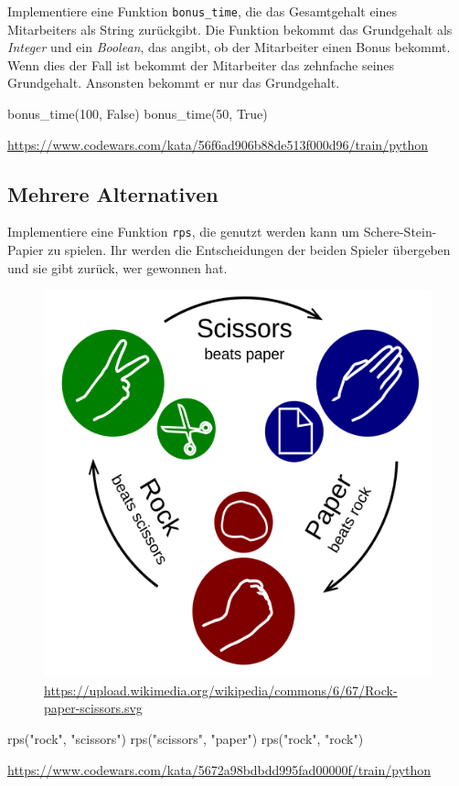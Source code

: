 \documentclass[class=scrartcl, crop=false]{standalone}
\begin{document}
\begin{aufgabe} \noindent
Implementiere eine Funktion \texttt{bonus_time}, die das Gesamtgehalt eines Mitarbeiters als String zurückgibt.
Die Funktion bekommt das Grundgehalt als \emph{Integer} und ein \emph{Boolean}, das angibt, ob der Mitarbeiter einen Bonus bekommt. Wenn dies der Fall ist bekommt der Mitarbeiter das zehnfache seines Grundgehalt. Ansonsten bekommt er nur das Grundgehalt.

\begin{pyconsole}
bonus_time(100, False)
bonus_time(50, True)
\end{pyconsole}
	
\noindent\url{https://www.codewars.com/kata/56f6ad906b88de513f000d96/train/python}


\end{aufgabe}


\subsection{Mehrere Alternativen}

\begin{aufgabe} \noindent
Implementiere eine Funktion \texttt{rps}, die genutzt werden kann um Schere-Stein-Papier zu spielen. Ihr werden die Entscheidungen der beiden Spieler übergeben und sie gibt zurück, wer gewonnen hat.

\begin{figure}[H]
	\centering	
	\includegraphics[width=0.4\linewidth]{rock-paper-scissors}
	\tiny \caption{\tiny \noindent\url{https://upload.wikimedia.org/wikipedia/commons/6/67/Rock-paper-scissors.svg}}
\end{figure}

\begin{pyconsole}
rps("rock", "scissors")
rps("scissors", "paper")
rps("rock", "rock")
\end{pyconsole}
	
\noindent\url{https://www.codewars.com/kata/5672a98bdbdd995fad00000f/train/python}
	
\end{aufgabe}
\end{document}
